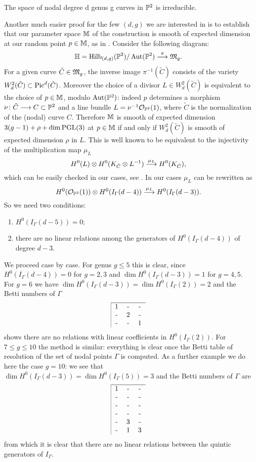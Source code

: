 \begin{theorem} The space
of nodal degree d genus g curves in ${\mathbb P}^2$ is irreducible.
\end{theorem}

Another much easier proof for the few $(d,g)$ we are interested in is to
establish that our parameter space ${\mathbb M}$ of the construction is smooth of 
expected dimension at our random point $p \in {\mathbb M}$, as in \cite{CO:AC}.
Consider the following diagram:
$${\mathbb H} = {\rm{Hilb}}_{(d,g)}({\mathbb P}^2)/\operatorname{Aut}({\mathbb P}^2) \stackrel{\pi}{\longrightarrow} \mathfrak M_g.$$
For a given curve ${\tilde C}\in\mathfrak M_g$, the inverse image $\pi^{-1} ({\tilde C})$ 
consists of the variety $W^2_d({\tilde C})\subset{\rm{Pic}}^d({\tilde C})$.
Moreover the choice of a divisor $L\in W^2_d({\tilde C})$ is equivalent to the 
choice of $p \in {\mathbb M}$, modulo $\operatorname{Aut}({\mathbb P}^2)$: 
indeed $p$ determines a morphism $\nu\colon {\tilde C} \longrightarrow C\subset {\mathbb P}^2$ 
and a line bundle $L=\nu^{-1}{\mathcal O}_{{\mathbb P}^2}(1)$, where ${\tilde C}$ is the 
normalization of the (nodal) curve $C$.
Therefore ${\mathbb M}$ is smooth of expected dimension $3(g-1)+\rho+\dim \operatorname{PGL}(3)$
at $p \in {\mathbb M}$ 
if and only if $W^2_d({\tilde C})$ is smooth of expected dimension $\rho$ in $L$.
This is well known to be equivalent to the injectivity of the multiplication map
$\mu_L$
$$
H^0(L)\otimes H^0(K_{\tilde C}\otimes L^{-1}) \stackrel{\mu_L}{\longrightarrow}H^0(K_{\tilde C}),
$$
which can be easily checked in our cases,
see \cite[p. 189]{CO:ACGH}.
In our cases $\mu_L$ can be rewritten as 
$$
H^0({\mathcal O}_{{\mathbb P}^2}(1))\otimes H^0(I_\Gamma(d-4)) \stackrel{\mu_L}{\longrightarrow}
H^0(I_\Gamma(d-3)).
$$
So we need two conditions: 
\begin{enumerate}
\item $H^0(I_\Gamma(d-5))=0$;
\item there are no linear relations among the generators of $H^0(I_\Gamma(d-4))$ of 
degree $d-3$.
\end{enumerate}
We proceed case by case.
For genus $g\leq 5$ this is clear, since $H^0(I_\Gamma(d-4))=0$ for $g=2,3$ and
$\dim H^0(I_\Gamma(d-3))=1$ for $g=4,5$. 
For $g=6$ we have $\dim H^0(I_\Gamma(d-3))= \dim H^0(I_\Gamma(2))=2$ and 
the Betti numbers of $\Gamma$ 
$$
\begin{tabular}{|ccc}\hline
1 & - & - \cr
- & 2 & - \cr
- & - & 1 \cr
\end{tabular}
$$
shows there are no relations 
with linear coefficients in $H^0(I_\Gamma(2))$.
For $7\leq g \leq 10$ the method is similar:
everything is clear once the Betti table of resolution of the set of nodal points 
$\Gamma$ is computed. As a further example we do here the case $g=10$: we see that
$\dim H^0(I_\Gamma(d-3))=\dim H^0(I_\Gamma(5))=3$ and the Betti numbers of $\Gamma$ are
$$
\begin{tabular}{|ccc}\hline
1 & - & - \cr
- & - & - \cr
- & - & - \cr
- & - & - \cr
- & 3 & - \cr
- & 1 & 3 \cr
\end{tabular}
$$
from which it is clear that there are no linear relations between the quintic generators
of $I_\Gamma$.

